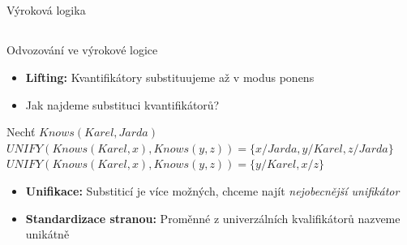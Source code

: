 \documentclass{beamer}
\begin{document}
\subsection{}
\begin{frame}{Výroková logika}
\end{frame}

\subsection{}
\begin{frame}{Odvozování ve výrokové logice}
\begin{itemize}
\item {\bf Lifting:} Kvantifikátory substituujeme až v modus ponens
\item Jak najdeme substituci kvantifikátorů?
\end{itemize}
\begin{center}
Nechť $Knows(Karel, Jarda)$
$UNIFY(Knows(Karel, x), Knows(y, z)) = \{ x/Jarda, y/Karel, z/Jarda \}$
$UNIFY(Knows(Karel, x), Knows(y, z)) = \{ y/Karel, x/z \}$
\end{center}
\begin{itemize}
\item {\bf Unifikace:} Substiticí je více možných, chceme najít {\em nejobecnější unifikátor}
\item {\bf Standardizace stranou:} Proměnné z univerzálních kvalifikátorů nazveme unikátně
\end{itemize}
\end{frame}
\end{document}
